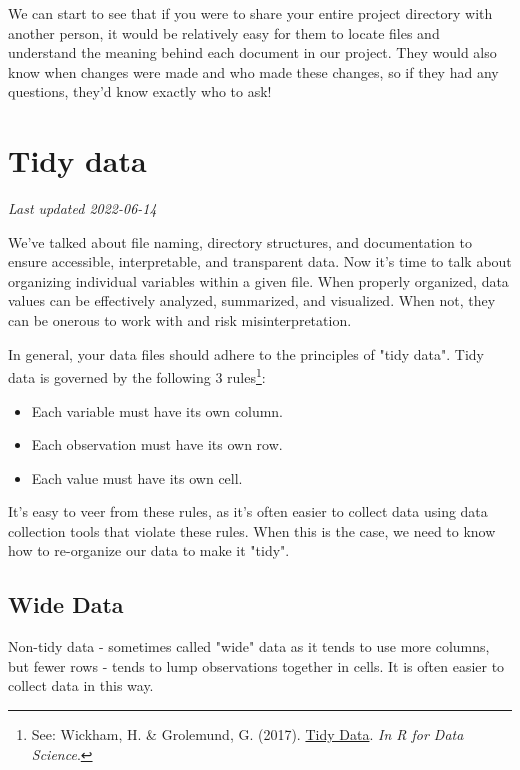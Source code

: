 \documentclass[
]{book}
\providecommand{\tightlist}{%
  \setlength{\itemsep}{0pt}\setlength{\parskip}{0pt}}
\begin{document}
We can start to see that if you were to share your entire project directory with another person, it would be relatively easy for them to locate files and understand the meaning behind each document in our project. They would also know when changes were made and who made these changes, so if they had any questions, they'd know exactly who to ask!

\hypertarget{tidy-data}{%
\chapter{Tidy data}\label{tidy-data}}

\emph{Last updated 2022-06-14}

We've talked about file naming, directory structures, and documentation to ensure accessible, interpretable, and transparent data. Now it's time to talk about organizing individual variables within a given file. When properly organized, data values can be effectively analyzed, summarized, and visualized. When not, they can be onerous to work with and risk misinterpretation.

In general, your data files should adhere to the principles of "tidy data". Tidy data is governed by the following 3 rules\footnote{See: Wickham, H. \& Grolemund, G. (2017). \href{https://r4ds.had.co.nz/tidy-data.html}{Tidy Data}. \emph{In R for Data Science}.}:

\begin{itemize}
\tightlist
\item
  Each variable must have its own column.
\item
  Each observation must have its own row.
\item
  Each value must have its own cell.
\end{itemize}

It's easy to veer from these rules, as it's often easier to collect data using data collection tools that violate these rules. When this is the case, we need to know how to re-organize our data to make it "tidy".

\hypertarget{wide-data}{%
\section{Wide Data}\label{wide-data}}

Non-tidy data - sometimes called "wide" data as it tends to use more columns, but fewer rows - tends to lump observations together in cells. It is often easier to collect data in this way.
\end{document}

